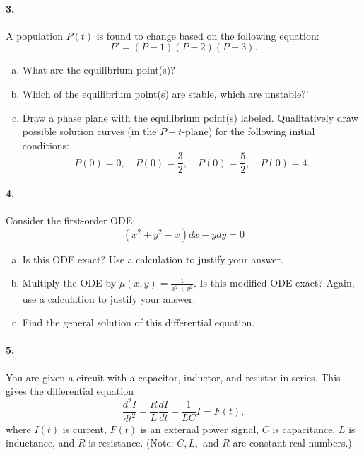 \documentclass[11pt]{article}
\begin{document}

\newpage
\paragraph{3.} A population $P(t)$ is found to change based on the following equation:
\[
P'=(P-1)(P-2)(P-3).
\]

\begin{enumerate}[(a)]
    \item What are the equilibrium point(s)?
    \item Which of the equilibrium point(s) are stable, which are unstable?'
    \item Draw a phase plane with the equilibrium point(s) labeled.  Qualitatively draw possible solution curves (in the $P-t$-plane) for the following initial conditions:
\[
P(0)=0, \quad P(0)=\frac{3}{2}, \quad P(0)=\frac{5}{2}, \quad P(0)=4.
\]
    
\end{enumerate}


\newpage
\paragraph{4.} Consider the first-order ODE:
\[
(x^2+y^2-x)dx - ydy = 0
\]

\begin{enumerate}[(a)]
    \item Is this ODE exact? Use a calculation to justify your answer.
    \item Multiply the ODE by $\mu(x,y)=\frac{1}{x^2+y^2}$. Is this modified ODE exact? Again, use a calculation to justify your answer.
    \item Find the general solution of this differential equation.
\end{enumerate}


\newpage
\paragraph{5.} You are given a circuit with a capacitor, inductor, and resistor in series.  This gives the differential equation
\[
\frac{d^2 I}{dt^2}+\frac{R}{L}\frac{dI}{dt}+\frac{1}{LC}I=F(t),
\]
where $I(t)$ is current, $F(t)$ is an external power signal, $C$ is capacitance, $L$ is inductance, and $R$ is resistance. (Note: $C,L,$ and $R$ are constant real numbers.)
\end{document}
